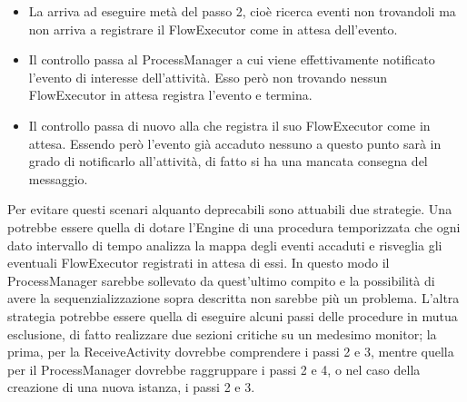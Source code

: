 \begin{itemize}
  \item La  arriva ad eseguire metà del passo 2, cioè
  ricerca eventi non trovandoli ma non arriva a registrare il FlowExecutor come
  in attesa dell'evento.
  \item Il controllo passa al ProcessManager a cui viene effettivamente
  notificato l'evento di interesse dell'attività. Esso però non trovando
  nessun FlowExecutor in attesa registra l'evento e termina.
  \item Il controllo passa di nuovo alla  che registra il
  suo FlowExecutor come in attesa. Essendo però l'evento già accaduto nessuno a
  questo punto sarà in grado di notificarlo all'attività, di fatto si ha una
  mancata consegna del messaggio.
\end{itemize}

Per evitare questi scenari alquanto deprecabili sono attuabili due strategie.
Una potrebbe essere quella di dotare l'Engine di una procedura temporizzata che
ogni dato intervallo di tempo analizza la mappa degli eventi accaduti e risveglia
gli eventuali FlowExecutor registrati in attesa di essi. In questo modo il
ProcessManager sarebbe sollevato da quest'ultimo compito e la possibilità di
avere la sequenzializzazione sopra descritta non sarebbe più un problema.
L'altra strategia potrebbe essere quella di eseguire alcuni passi delle
procedure in mutua esclusione, di fatto realizzare due sezioni critiche su un
medesimo monitor; la prima, per la ReceiveActivity dovrebbe comprendere i passi
2 e 3, mentre quella per il ProcessManager dovrebbe raggruppare i passi 2 e 4, o
nel caso della creazione di una nuova istanza, i passi 2 e 3.

